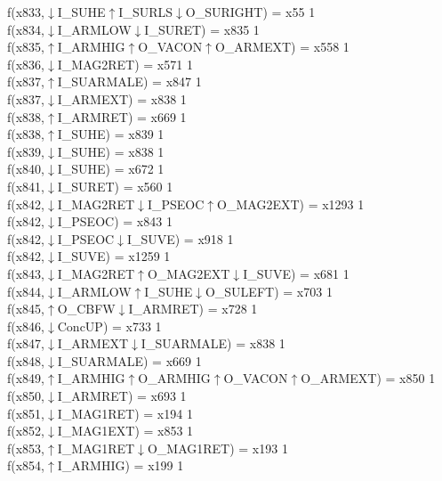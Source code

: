 f(x833,$\downarrow$I\_SUHE$\uparrow$I\_SURLS$\downarrow$O\_SURIGHT) = x55 {1} \\
f(x834,$\downarrow$I\_ARMLOW$\downarrow$I\_SURET) = x835 {1} \\
f(x835,$\uparrow$I\_ARMHIG$\uparrow$O\_VACON$\uparrow$O\_ARMEXT) = x558 {1} \\
f(x836,$\downarrow$I\_MAG2RET) = x571 {1} \\
f(x837,$\uparrow$I\_SUARMALE) = x847 {1} \\
f(x837,$\downarrow$I\_ARMEXT) = x838 {1} \\
f(x838,$\uparrow$I\_ARMRET) = x669 {1} \\
f(x838,$\uparrow$I\_SUHE) = x839 {1} \\
f(x839,$\downarrow$I\_SUHE) = x838 {1} \\
f(x840,$\downarrow$I\_SUHE) = x672 {1} \\
f(x841,$\downarrow$I\_SURET) = x560 {1} \\
f(x842,$\downarrow$I\_MAG2RET$\downarrow$I\_PSEOC$\uparrow$O\_MAG2EXT) = x1293 {1} \\
f(x842,$\downarrow$I\_PSEOC) = x843 {1} \\
f(x842,$\downarrow$I\_PSEOC$\downarrow$I\_SUVE) = x918 {1} \\
f(x842,$\downarrow$I\_SUVE) = x1259 {1} \\
f(x843,$\downarrow$I\_MAG2RET$\uparrow$O\_MAG2EXT$\downarrow$I\_SUVE) = x681 {1} \\
f(x844,$\downarrow$I\_ARMLOW$\uparrow$I\_SUHE$\downarrow$O\_SULEFT) = x703 {1} \\
f(x845,$\uparrow$O\_CBFW$\downarrow$I\_ARMRET) = x728 {1} \\
f(x846,$\downarrow$ConcUP) = x733 {1} \\
f(x847,$\downarrow$I\_ARMEXT$\downarrow$I\_SUARMALE) = x838 {1} \\
f(x848,$\downarrow$I\_SUARMALE) = x669 {1} \\
f(x849,$\uparrow$I\_ARMHIG$\uparrow$O\_ARMHIG$\uparrow$O\_VACON$\uparrow$O\_ARMEXT) = x850 {1} \\
f(x850,$\downarrow$I\_ARMRET) = x693 {1} \\
f(x851,$\downarrow$I\_MAG1RET) = x194 {1} \\
f(x852,$\downarrow$I\_MAG1EXT) = x853 {1} \\
f(x853,$\uparrow$I\_MAG1RET$\downarrow$O\_MAG1RET) = x193 {1} \\
f(x854,$\uparrow$I\_ARMHIG) = x199 {1} \\
